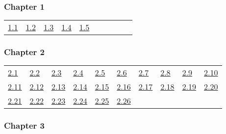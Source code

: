 \subsubsection*{Chapter 1} 

\begin{tabular}{llllllllll}
\hyperref[Figure 1.1]{1.1} &
\hyperref[Figure 1.2]{1.2} &
\hyperref[Figure 1.3]{1.3} &
\hyperref[Figure 1.4]{1.4} &
\hyperref[Figure 1.5]{1.5} &
\end{tabular} 

\subsubsection*{Chapter 2} 

\begin{tabular}{llllllllll}
\hyperref[Figure 2.1]{2.1} &
\hyperref[Figure 2.2]{2.2} &
\hyperref[Figure 2.3]{2.3} &
\hyperref[Figure 2.4]{2.4} &
\hyperref[Figure 2.5]{2.5} &
\hyperref[Figure 2.6]{2.6} &
\hyperref[Figure 2.7]{2.7} &
\hyperref[Figure 2.8]{2.8} &
\hyperref[Figure 2.9]{2.9} &
\hyperref[Figure 2.10]{2.10}
\\ 
\hyperref[Figure 2.11]{2.11} &
\hyperref[Figure 2.12]{2.12} &
\hyperref[Figure 2.13]{2.13} &
\hyperref[Figure 2.14]{2.14} &
\hyperref[Figure 2.15]{2.15} &
\hyperref[Figure 2.16]{2.16} &
\hyperref[Figure 2.17]{2.17} &
\hyperref[Figure 2.18]{2.18} &
\hyperref[Figure 2.19]{2.19} &
\hyperref[Figure 2.20]{2.20}
\\ 
\hyperref[Figure 2.21]{2.21} &
\hyperref[Figure 2.22]{2.22} &
\hyperref[Figure 2.23]{2.23} &
\hyperref[Figure 2.24]{2.24} &
\hyperref[Figure 2.25]{2.25} &
\hyperref[Figure 2.26]{2.26} &
\end{tabular} 

\subsubsection*{Chapter 3} 

